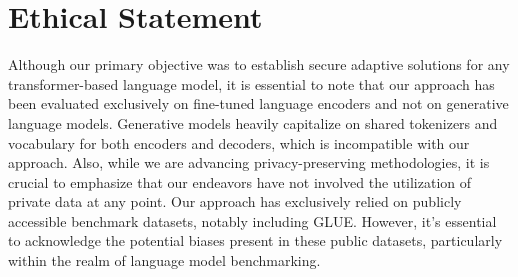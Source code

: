 \documentclass[letterpaper]{article} %
\begin{document}
\section*{Ethical Statement}
\label{sec:ethics}
Although our primary objective was to establish secure adaptive solutions for any transformer-based language model, it is essential to note that our approach has been evaluated exclusively on fine-tuned language encoders and not on generative language models. Generative models heavily capitalize on shared tokenizers and vocabulary for both encoders and decoders, which is incompatible with our approach. Also, while we are advancing privacy-preserving methodologies, it is crucial to emphasize that our endeavors have not involved the utilization of private data at any point. Our approach has exclusively relied on publicly accessible benchmark datasets, notably including GLUE. However, it's essential to acknowledge the potential biases present in these public datasets, particularly within the realm of language model benchmarking.

\end{document}
